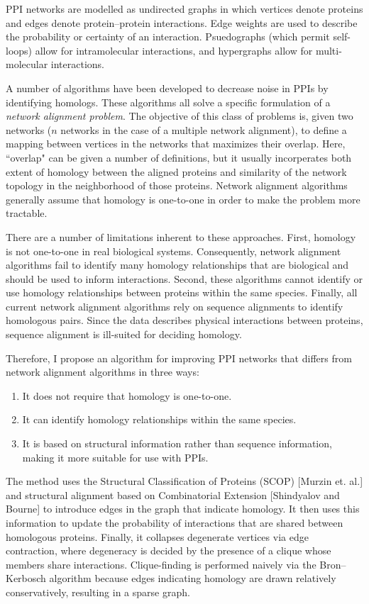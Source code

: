 \documentclass[12pt,twoside]{article}
\def\NI{\noindent}
\def\NS{
	\setlength{\itemsep}{0.1em}
	\setlength{\parskip}{0em}
	\setlength{\parsep}{0em}
}
\def\RS{
	\setlength{\itemsep}{0em}
	\setlength{\parskip}{0.4em}
	\setlength{\parsep}{0em}
}
\begin{document}
\NI PPI networks are modelled as undirected graphs in which vertices denote proteins and edges denote protein--protein interactions. Edge weights are used to describe the probability or certainty of an interaction. Psuedographs (which permit self-loops) allow for intramolecular interactions, and hypergraphs allow for multi-molecular interactions.

\NI A number of algorithms have been developed to decrease noise in PPIs by identifying homologs. These algorithms all solve a specific formulation of a \emph{network alignment problem}. The objective of this class of problems is, given two networks ($n$ networks in the case of a multiple network alignment), to define a mapping between vertices in the networks that maximizes their overlap. Here, ``overlap" can be given a number of definitions, but it usually incorperates both extent of homology between the aligned proteins and similarity of the network topology in the neighborhood of those proteins. Network alignment algorithms generally assume that homology is one-to-one in order to make the problem more tractable.

\NI There are a number of limitations inherent to these approaches. First, homology is not one-to-one in real biological systems. Consequently, network alignment algorithms fail to identify many homology relationships that are biological and should be used to inform interactions. Second, these algorithms cannot identify or use homology relationships between proteins within the same species. Finally, all current network alignment algorithms rely on sequence alignments to identify homologous pairs. Since the data describes physical interactions between proteins, sequence alignment is ill-suited for deciding homology.

\NI Therefore, I propose an algorithm for improving PPI networks that differs from network alignment algorithms in three ways:
\NS
\begin{enumerate}
\NS
\item It does not require that homology is one-to-one.
\item It can identify homology relationships within the same species.
\item It is based on structural information rather than sequence information, making it more suitable for use with PPIs.
\end{enumerate}

\NI The method uses the Structural Classification of Proteins (SCOP) [Murzin et. al.] and structural alignment based on Combinatorial Extension [Shindyalov and Bourne] to introduce edges in the graph that indicate homology. It then uses this information to update the probability of interactions that are shared between homologous proteins. Finally, it collapses degenerate vertices via edge contraction, where degeneracy is decided by the presence of a clique whose members share interactions. Clique-finding is performed naively via the Bron--Kerbosch algorithm because edges indicating homology are drawn relatively conservatively, resulting in a sparse graph.\RS
\end{document}
